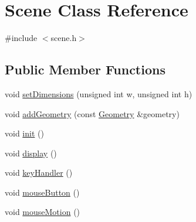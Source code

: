 \hypertarget{class_scene}{\section{Scene Class Reference}
\label{class_scene}
}


{\ttfamily \#include $<$scene.\+h$>$}

\subsection*{Public Member Functions}
\begin{DoxyCompactItemize}
\item 
void \hyperlink{class_scene_a42b1481ada95342cfb71d6a6e6bcc3c5}{set\+Dimensions} (unsigned int w, unsigned int h)
\item 
void \hyperlink{class_scene_acbf85916173784558177e62dfba7acb9}{add\+Geometry} (const \hyperlink{class_geometry}{Geometry} \&geometry)
\item 
void \hyperlink{class_scene_abb3b6efc6fdba03cd96436edaf08a967}{init} ()
\item 
void \hyperlink{class_scene_ae1dc07ec420ecd407a3a47910438167a}{display} ()
\item 
void \hyperlink{class_scene_a59f325fa74a642ebeb27f59f0455e06e}{key\+Handler} ()
\item 
void \hyperlink{class_scene_aa7342d108ff80f49d39b89570d6be4aa}{mouse\+Button} ()
\item 
void \hyperlink{class_scene_a479536d524e9879442b9c59d3c8d7e2e}{mouse\+Motion} ()
\end{DoxyCompactItemize}
